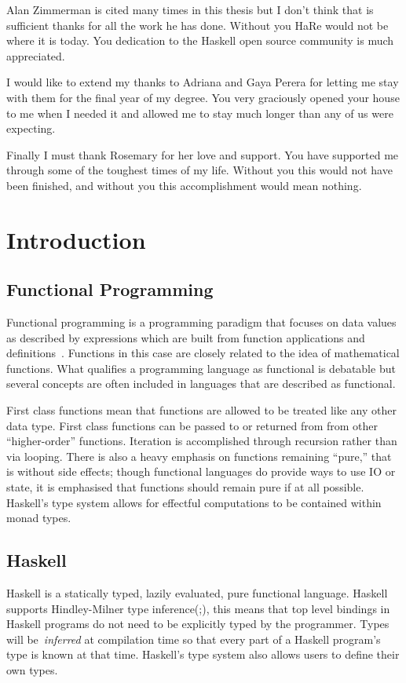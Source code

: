 \begin{preface}
Alan Zimmerman is cited many times in this thesis but I don't think that is sufficient thanks for all the work he has done. Without you HaRe would not be where it is today. You dedication to the Haskell open source community is much appreciated.

I would like to extend my thanks to Adriana and Gaya Perera for letting me stay with them for the final year of my degree. You very graciously opened your house to me when I needed it and allowed me to stay much longer than any of us were expecting.

Finally I must thank Rosemary for her love and support. You have supported me through some of the toughest times of my life. Without you this would not have been finished, and without you this accomplishment would mean nothing.

\end{preface}

\chapter{Introduction}\label{chp:intro}


\section{Functional Programming}
Functional programming is a programming paradigm that focuses on data values as described by expressions which are built from function applications and definitions~\citep{elementsOfFunc}.  Functions in this case are closely related to the idea of mathematical functions. What qualifies a programming language as functional is debatable but several concepts are often included in languages that are described as functional. 

First class functions mean that functions are allowed to be treated like any other data type. First class functions can be passed to or returned from from other ``higher-order'' functions. Iteration is accomplished through recursion rather than via looping. There is also a heavy emphasis on functions remaining ``pure,'' that is without side effects; though functional languages do provide ways to use IO or state, it is emphasised that functions should remain pure if at all possible. Haskell's type system allows for effectful computations to be contained within monad types.
  
\section{Haskell}
\label{haskell}
Haskell is a statically typed, lazily evaluated, pure functional language. Haskell supports Hindley-Milner type inference(\cite{hindley};\cite{milner}), this  means that top level bindings in Haskell programs do not need to be explicitly typed by the programmer. Types will be~\textit{inferred} at compilation time so that every part of a Haskell program's type is known at that time. Haskell's type system also allows users to define their own types.

